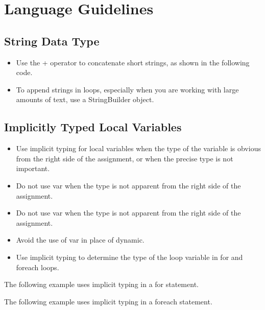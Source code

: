 \documentclass[11pt]{article}
\begin{document}
\section{Language Guidelines}
\subsection{String Data Type}
\begin{itemize}
  \item Use the + operator to concatenate short strings, as shown in the following code.
\end{itemize}

\begin{itemize}
  \item To append strings in loops, especially when you are working with large amounts of text, use a StringBuilder object.
\end{itemize}

\subsection{Implicitly Typed Local Variables}
\begin{itemize}
  \item Use implicit typing for local variables when the type of the variable is obvious from the right side of the assignment, or when the precise type is not important.
\end{itemize}

\begin{itemize}
  \item Do not use var when the type is not apparent from the right side of the assignment.
\end{itemize}

\begin{itemize}
  \item Do not use var when the type is not apparent from the right side of the assignment.
\end{itemize}

\begin{itemize}
  \item Avoid the use of var in place of dynamic.
  \item Use implicit typing to determine the type of the loop variable in for and foreach loops.
\end{itemize}
The following example uses implicit typing in a for statement.

The following example uses implicit typing in a foreach statement.

\end{document}
